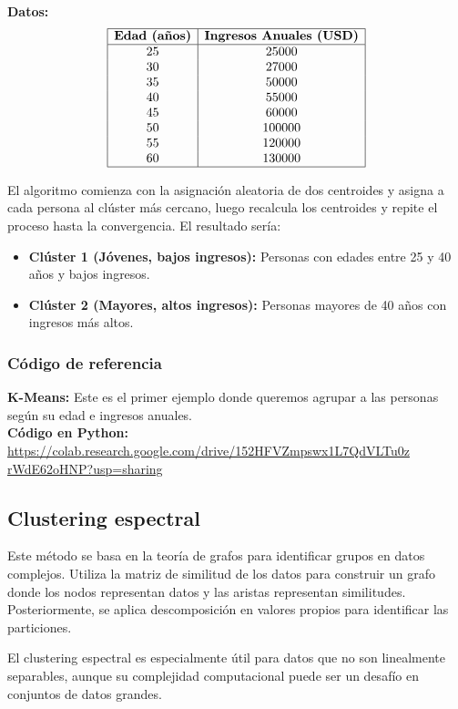 \documentclass[12pt]{book}
\begin{document}
	\textbf{Datos:}
	\[
	\begin{array}{|c|c|}
		\hline
		\textbf{Edad (años)} & \textbf{Ingresos Anuales (USD)} \\
		\hline
		25 & 25000 \\
		30 & 27000 \\
		35 & 50000 \\
		40 & 55000 \\
		45 & 60000 \\
		50 & 100000 \\
		55 & 120000 \\
		60 & 130000 \\
		\hline
	\end{array}
	\]
	
	El algoritmo comienza con la asignación aleatoria de dos centroides y asigna a cada persona al clúster más cercano, luego recalcula los centroides y repite el proceso hasta la convergencia. El resultado sería:
	\begin{itemize}
		\item \textbf{Clúster 1 (Jóvenes, bajos ingresos):} Personas con edades entre 25 y 40 años y bajos ingresos.
		\item \textbf{Clúster 2 (Mayores, altos ingresos):} Personas mayores de 40 años con ingresos más altos.
	\end{itemize}
	\subsubsection*{Código de referencia}
	\textbf{K-Means:} Este es el primer ejemplo donde queremos agrupar a las personas según su edad e ingresos anuales. \\
	\textbf{Código en Python:} \\ \url{https://colab.research.google.com/drive/152HFVZmpswx1L7QdVLTu0z
	rWdE62oHNP?usp=sharing}
	
	\subsection{Clustering espectral}
	Este método se basa en la teoría de grafos para identificar grupos en datos complejos. Utiliza la matriz de similitud de los datos para construir un grafo donde los nodos representan datos y las aristas representan similitudes. Posteriormente, se aplica descomposición en valores propios para identificar las particiones.
	
	El clustering espectral es especialmente útil para datos que no son linealmente separables, aunque su complejidad computacional puede ser un desafío en conjuntos de datos grandes.
	
\end{document}

